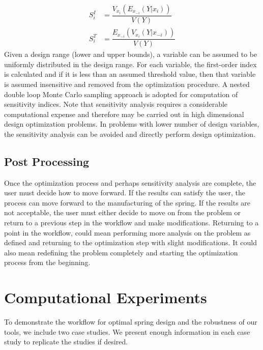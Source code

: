 \documentclass[10pt]{article}
\begin{document}
\begin{eqnarray}
S_{i}^{I} &= \dfrac{V_{x_i}(E_{x_{-i}}(Y|x_{i}))}{V(Y)} \\
S_{i}^{T} &= \dfrac{E_{x_{-i}}(V_{x_{i}}(Y|x_{-i}))}{V(Y)}
\end{eqnarray}
Given a design range (lower and upper bounds), a variable can be assumed to be uniformly distributed in the design range. For each variable, the first-order index is calculated and if it is less than an assumed threshold value, then that variable is assumed insensitive and removed from the optimization procedure. A nested double loop Monte Carlo sampling approach is adopted for computation of sensitivity indices. Note that sensitivity analysis requires a considerable computational expense and therefore may be carried out in high dimensional design optimization problems. In problems with lower number of design variables, the sensitivity analysis can be avoided and directly perform design optimization. 

\subsection{Post Processing}
\label{subsec:Post_Processing}

Once the optimization process and perhaps sensitivity analysis are complete, the user must decide how to move forward. If the results can satisfy the user, the process can move forward to the manufacturing of the spring. If the results are not acceptable, the user must either decide to move on from the problem or return to a previous step in the workflow and make modifications. Returning to a point in the workflow, could mean performing more analysis on the problem as defined and returning to the optimization step with slight modifications. It could also mean redefining the problem completely and starting the optimization process from the beginning.

\section{Computational Experiments}
\label{sec:Computational_Experiments}

To demonstrate the workflow for optimal spring design and the robustness of our tools, we include two case studies. We present enough information in each case study to replicate the studies if desired.
\end{document}
